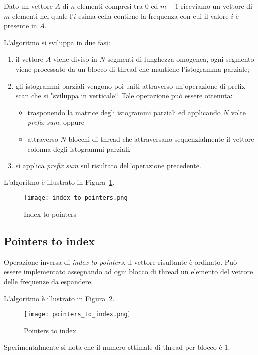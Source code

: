 Dato un vettore $A$ di $n$ elementi compresi tra $0$ ed $m-1$ riceviamo un vettore di $m$ elementi nel quale l'$i$-esima cella contiene la frequenza con cui il valore $i$ è presente in $A$. 

L'algoritmo si sviluppa in due fasi:
\begin{enumerate}
    \item il vettore $A$ viene diviso in $N$ segmenti di lunghezza omogenea, ogni segmento viene processato da un blocco di thread che mantiene l'istogramma parziale;
    \item gli istogrammi parziali vengono poi uniti attraverso un'operazione di prefix scan che si "sviluppa in verticale``. Tale operazione può essere ottenuta:
    \begin{itemize}
        \item trasponendo la matrice degli istogrammi parziali ed applicando $N$ volte \emph{prefix sum}; oppure
        \item attraverso $N$ blocchi di thread che attraversano sequenzialmente il vettore colonna degli istogrammi parziali.
    \end{itemize}
    \item si applica \emph{prefix sum} sul risultato dell'operazione precedente.
\end{enumerate}

L'algoritmo è illustrato in Figura~\ref{index_to_pointers}. 

\begin{figure}[t]
    \centering
	\texttt{[image: index\_to\_pointers.png]}
	\caption{Index to pointers}
	\label{index_to_pointers}
\end{figure}

\subsection{Pointers to index}

Operazione inversa di \emph{index to pointers}. Il vettore risultante è ordinato. Può essere implementato assegnando ad ogni blocco di thread un elemento del vettore delle frequenze da espandere. 

L'algoritmo è illustrato in Figura~\ref{pointers_to_index}. 

\begin{figure}[t]
    \centering
	\texttt{[image: pointers\_to\_index.png]}
	\caption{Pointers to index}
	\label{pointers_to_index}
\end{figure}

Sperimentalmente si nota che il numero ottimale di thread per blocco è $1$.
